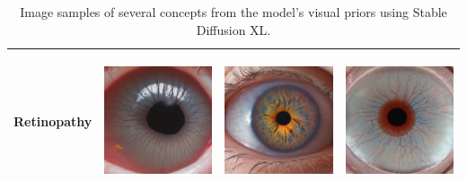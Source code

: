 \begin{table}[H]
\begin{tabularx}{\linewidth}{@{}>{\centering\arraybackslash}m{3cm}>{\centering\arraybackslash}X>{\centering\arraybackslash}X>{\centering\arraybackslash}X@{}}
Retinopathy & \includegraphics[valign=M,width=\linewidth,height=4cm,keepaspectratio]{main/content/images/prior_concepts_sd/xl/retinopathy/retinopathy-0.jpg} & \includegraphics[valign=M,width=\linewidth,height=4cm,keepaspectratio]{main/content/images/prior_concepts_sd/xl/retinopathy/retinopathy-1.jpg} & \includegraphics[valign=M,width=\linewidth,height=4cm,keepaspectratio]{main/content/images/prior_concepts_sd/xl/retinopathy/retinopathy-2.jpg} \\
\bottomrule
\end{tabularx}
\caption{Image samples of several concepts from the model's visual priors using Stable Diffusion XL.}
\label{tab:sample_images_priors_sdxl}
\end{table}